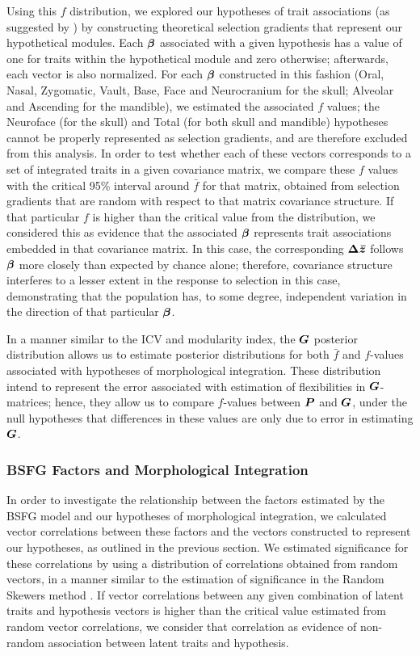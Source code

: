 \documentclass [twocolumn, natbib, nospthms, 10pt] {svjour3}
\begin{document}
Using this $f$ distribution, we explored our hypotheses of trait
associations (as suggested by \citealp {hansen_measuring_2008}) by
constructing theoretical selection gradients that represent our
hypothetical modules. Each $\boldsymbol{\beta}$ associated with a given
hypothesis has a value of one for traits within the hypothetical
module and zero otherwise; afterwards, each vector is also
normalized. For each $\boldsymbol{\beta}$ constructed in this fashion (Oral,
Nasal, Zygomatic, Vault, Base, Face and Neurocranium for the skull;
Alveolar and Ascending for the mandible), we estimated the associated
$f$ values; the Neuroface (for the skull) and Total (for both skull
and mandible) hypotheses cannot be properly represented as selection
gradients, and are therefore excluded from this analysis. In order to
test whether each of these vectors corresponds to a set of integrated
traits in a given covariance matrix, we compare these $f$ values with
the critical 95\% interval around $\bar{f}$ for that matrix, obtained
from selection gradients that are random with respect to that matrix
covariance structure. If that particular $f$ is higher than the
critical value from the distribution, we considered this as evidence
that the associated $\boldsymbol{\beta}$ represents trait associations
embedded in that covariance matrix. In this case, the corresponding
$\boldsymbol{\Delta\bar{z}}$ follows $\boldsymbol{\beta}$ more closely than expected
by chance alone; therefore, covariance structure interferes to a
lesser extent in the response to selection in this case, demonstrating
that the population has, to some degree, independent variation in the
direction of that particular $\boldsymbol{\beta}$.

In a manner similar to the ICV and modularity index, the $\boldsymbol{G}$
posterior distribution allows us to estimate posterior distributions
for both $\bar{f}$ and $f$-values associated with hypotheses of
morphological integration. These distribution intend to represent the
error associated with estimation of flexibilities in
$\boldsymbol{G}$-matrices; hence, they allow us to compare $f$-values between
$\boldsymbol{P}$ and $\boldsymbol{G}$, under the null hypotheses that differences in
these values are only due to error in estimating $\boldsymbol{G}$.

\subsubsection {BSFG Factors and Morphological Integration}

In order to investigate the relationship between the factors estimated
by the BSFG model and our hypotheses of morphological integration, we
calculated vector correlations between these factors and the vectors
constructed to represent our hypotheses, as outlined in the previous
section. We estimated significance for these correlations by using a
distribution of correlations obtained from random vectors, in a manner
similar to the estimation of significance in the Random Skewers method
\citep{cheverud_comparing_2007}. If vector correlations between any
given combination of latent traits and hypothesis vectors is higher
than the critical value estimated from random vector correlations, we
consider that correlation as evidence of non-random association
between latent traits and hypothesis.
\end{document}
